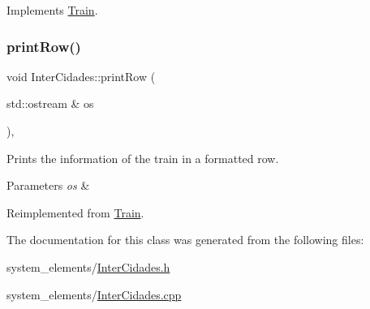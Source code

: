 Implements \mbox{\hyperlink{classTrain_ad2bd424547b5be4e3fa8e491f1ce790d}{Train}}.

\mbox{\label{classInterCidades_af3a946b18bb99a7d1372d2dad4588639}} 
\subsubsection{\texorpdfstring{print\+Row()}{printRow()}}
{\footnotesize\ttfamily void Inter\+Cidades\+::print\+Row (\begin{DoxyParamCaption}\item[{std\+::ostream \&}]{os }\end{DoxyParamCaption})\hspace{0.3cm}{\ttfamily [override]}, {\ttfamily [virtual]}}

Prints the information of the train in a formatted row.


\begin{DoxyParams}{Parameters}
{\em os} & \\
\hline
\end{DoxyParams}


Reimplemented from \mbox{\hyperlink{classTrain_a3fd1c87c2152aa96cc6928f0aea37e21}{Train}}.



The documentation for this class was generated from the following files\+:\begin{DoxyCompactItemize}
\item 
system\+\_\+elements/\mbox{\hyperlink{InterCidades_8h}{Inter\+Cidades.\+h}}\item 
system\+\_\+elements/\mbox{\hyperlink{InterCidades_8cpp}{Inter\+Cidades.\+cpp}}\end{DoxyCompactItemize}
